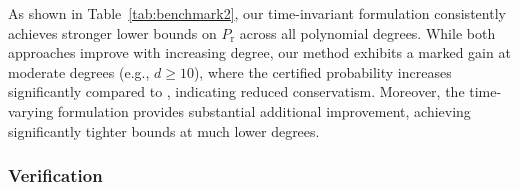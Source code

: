 \documentclass[journal,twoside,web]{ieeecolor}
\newcommand{\reach}{\mathrm{r}}
\newcommand{\low}[1]{\underline{#1}}
\theoremstyle{definition}
\theoremstyle{plain}
\theoremstyle{plain}
\begin{document}
\begin{table}[t]
\centering
\caption{Probability bound comparison against \cite{xue2025finite}. 
\texttt{TI} and \texttt{TV} are time-invariant and -varying, and
\texttt{deg} is the degree of SOS polynomial.
}
\label{tab:benchmark2}
\end{table}

As shown in Table~\ref{tab:benchmark2}, our time-invariant formulation consistently achieves stronger lower bounds on $P_\reach$ across all polynomial degrees. While both approaches improve with increasing degree, our method exhibits a marked gain at moderate degrees (e.g., $d \geq 10$), where the certified probability increases significantly compared to \cite{xue2025finite}, indicating reduced conservatism.
Moreover, the time-varying formulation provides substantial additional improvement, achieving significantly tighter bounds at much lower degrees. 



\subsubsection{Verification}
\end{document}
